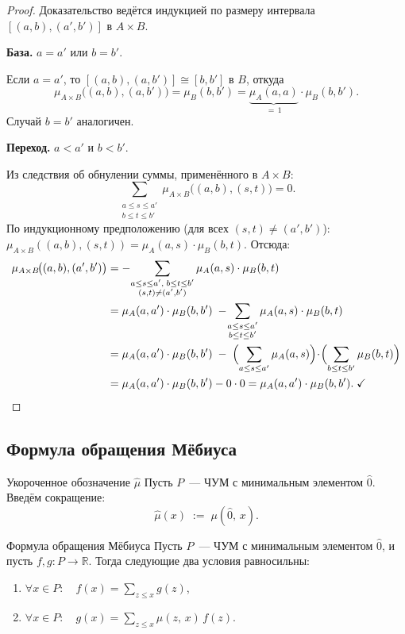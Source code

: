 \begin{proof}
	Доказательство ведётся индукцией по размеру интервала $[(a,b),(a',b')]$ в $A\times B$.
	
	\textbf{База.} $a = a'$ или $b = b'$.
	
	Если $a = a'$, то $[(a,b),(a,b')] \cong [b,b']$ в $B$, откуда
	\[
	\mu_{A\times B}\!\bigl((a,b),(a,b')\bigr)
	= \mu_B(b,b')
	= \underbrace{\mu_A(a,a)}_{=\,1}\cdot\mu_B(b,b').
	\]
	Случай $b = b'$ аналогичен.\;\checkmark
	
	\textbf{Переход.} $a < a'$ и $b < b'$.
	
	Из следствия об обнулении суммы, применённого в $A\times B$:
	\[
	\sum_{\substack{a \leq s \leq a' \\ b \leq t \leq b'}}
	\mu_{A\times B}\!\bigl((a,b),(s,t)\bigr) = 0.
	\]
	По индукционному предположению (для всех $(s,t)\neq(a',b')$):
	$\mu_{A\times B}((a,b),(s,t)) = \mu_A(a,s)\cdot\mu_B(b,t)$.
	Отсюда:
	\begin{align*}
		\mu_{A\times B}\!\bigl((a,b),(a',b')\bigr)
		&= -\!\sum_{\substack{a\leq s\leq a',\;b\leq t\leq b'\\(s,t)\neq(a',b')}}
		\mu_A(a,s)\cdot\mu_B(b,t)\\
		&= \mu_A(a,a')\cdot\mu_B(b,b')
		\;-\!\sum_{\substack{a\leq s\leq a'\\b\leq t\leq b'}}
		\mu_A(a,s)\cdot\mu_B(b,t)\\
		&= \mu_A(a,a')\cdot\mu_B(b,b')
		\;-\;\Bigl(\sum_{a\leq s\leq a'}\mu_A(a,s)\Bigr)
		\!\cdot\!\Bigl(\sum_{b\leq t\leq b'}\mu_B(b,t)\Bigr)\\
		&= \mu_A(a,a')\cdot\mu_B(b,b') - 0\cdot 0
		= \mu_A(a,a')\cdot\mu_B(b,b').\;\checkmark
	\end{align*}
\end{proof}

\subsection{Формула обращения Мёбиуса}

\begin{Definition}{Укороченное обозначение $\hat{\mu}$}{}
	Пусть $P$~--- ЧУМ с минимальным элементом $\hat{0}$. Введём сокращение:
	\[
	\hat{\mu}(x) \;:=\; \mu(\hat{0},\, x).
	\]
\end{Definition}

\begin{Theorem}{Формула обращения Мёбиуса}{}
	Пусть $P$~--- ЧУМ с минимальным элементом $\hat{0}$, и пусть $f, g \colon P \to \mathbb{R}$.
	Тогда следующие два условия равносильны:
	\begin{enumerate}
		\item $\forall x \in P\colon\quad f(x) = \displaystyle\sum_{z \leq x} g(z)$,
		\item $\forall x \in P\colon\quad g(x) = \displaystyle\sum_{z \leq x} \mu(z,\, x)\, f(z)$.
	\end{enumerate}
\end{Theorem}

